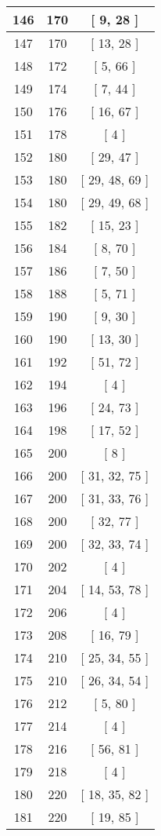 \begin{center}
\begin{longtable}[H]{|| c c c ||}
\hline
146 & 170 & [ 9, 28 ] \\ 
\hline
147 & 170 & [ 13, 28 ] \\ 
\hline
148 & 172 & [ 5, 66 ] \\ 
\hline
149 & 174 & [ 7, 44 ] \\ 
\hline
150 & 176 & [ 16, 67 ] \\ 
\hline
151 & 178 & [ 4 ] \\ 
\hline
152 & 180 & [ 29, 47 ] \\ 
\hline
153 & 180 & [ 29, 48, 69 ] \\ 
\hline
154 & 180 & [ 29, 49, 68 ] \\ 
\hline
155 & 182 & [ 15, 23 ] \\ 
\hline
156 & 184 & [ 8, 70 ] \\ 
\hline
157 & 186 & [ 7, 50 ] \\ 
\hline
158 & 188 & [ 5, 71 ] \\ 
\hline
159 & 190 & [ 9, 30 ] \\ 
\hline
160 & 190 & [ 13, 30 ] \\ 
\hline
161 & 192 & [ 51, 72 ] \\ 
\hline
162 & 194 & [ 4 ] \\ 
\hline
163 & 196 & [ 24, 73 ] \\ 
\hline
164 & 198 & [ 17, 52 ] \\ 
\hline
165 & 200 & [ 8 ] \\ 
\hline
166 & 200 & [ 31, 32, 75 ] \\ 
\hline
167 & 200 & [ 31, 33, 76 ] \\ 
\hline
168 & 200 & [ 32, 77 ] \\ 
\hline
169 & 200 & [ 32, 33, 74 ] \\ 
\hline
170 & 202 & [ 4 ] \\ 
\hline
171 & 204 & [ 14, 53, 78 ] \\ 
\hline
172 & 206 & [ 4 ] \\ 
\hline
173 & 208 & [ 16, 79 ] \\ 
\hline
174 & 210 & [ 25, 34, 55 ] \\ 
\hline
175 & 210 & [ 26, 34, 54 ] \\ 
\hline
176 & 212 & [ 5, 80 ] \\ 
\hline
177 & 214 & [ 4 ] \\ 
\hline
178 & 216 & [ 56, 81 ] \\ 
\hline
179 & 218 & [ 4 ] \\ 
\hline
180 & 220 & [ 18, 35, 82 ] \\ 
\hline
181 & 220 & [ 19, 85 ] \\ 

\end{longtable}
\end{center}
